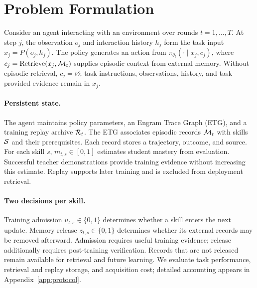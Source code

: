\section{Problem Formulation}
\label{sec:problem}
Consider an agent interacting with an environment over rounds $t=1,\ldots,T$. At step $j$, the observation $o_j$ and interaction history $h_j$ form the task input $x_j=P(o_j,h_j)$. The policy generates an action from $\pi_{\theta_t}(\cdot\mid x_j,c_j)$, where $c_j=\operatorname{Retrieve}(x_j,\mathcal{M}_t)$ supplies episodic context from external memory. Without episodic retrieval, $c_j=\varnothing$; task instructions, observations, history, and task-provided evidence remain in $x_j$.

\paragraph{Persistent state.}
The agent maintains policy parameters, an Engram Trace Graph (ETG), and a training replay archive $\mathcal{R}_t$. The ETG associates episodic records $\mathcal{M}_t$ with skills $\mathcal{S}$ and their prerequisites. Each record stores a trajectory, outcome, and source. For each skill $s$, $m_{t,s}\in[0,1]$ estimates student mastery from evaluation. Successful teacher demonstrations provide training evidence without increasing this estimate. Replay supports later training and is excluded from deployment retrieval.

\paragraph{Two decisions per skill.}
Training admission $u_{t,s}\in\{0,1\}$ determines whether a skill enters the next update. Memory release $z_{t,s}\in\{0,1\}$ determines whether its external records may be removed afterward. Admission requires useful training evidence; release additionally requires post-training verification. Records that are not released remain available for retrieval and future learning. We evaluate task performance, retrieval and replay storage, and acquisition cost; detailed accounting appears in Appendix~\ref{app:protocol}.
